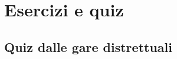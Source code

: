\chapter{Esercizi e quiz}
\label{ch:quiz}


\section{Quiz dalle gare distrettuali}
\label{sec:quiz_gare_distrettuali}

\begin{esercizio}
    \label{ex:distrettuale_2023_3}


\end{esercizio}
